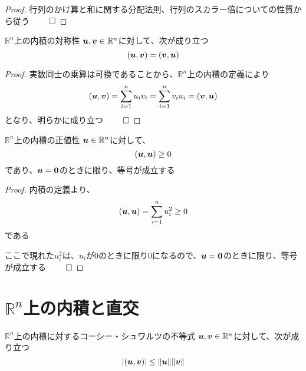 \documentclass[../../../topic_linear-algebra]{subfiles}
\begin{document}
\begin{proof}
  行列のかけ算と和に関する分配法則、行列のスカラー倍についての性質から従う $\qed$
\end{proof}

\br

\begin{theorem}{$\mathbb{R}^n$上の内積の対称性}
  $\vb*{u}, \vb*{v} \in \mathbb{R}^n$に対して、次が成り立つ
  \begin{equation*}
    (\vb*{u}, \vb*{v}) = (\vb*{v}, \vb*{u})
  \end{equation*}
\end{theorem}

\begin{proof}
  実数同士の乗算は可換であることから、$\mathbb{R}^n$上の内積の定義により
  \begin{equation*}
    (\vb*{u}, \vb*{v}) = \sum_{i=1}^n u_i v_i = \sum_{i=1}^n v_i u_i = (\vb*{v}, \vb*{u})
  \end{equation*}
  となり、明らかに成り立つ $\qed$
\end{proof}

\br

\begin{theorem}{$\mathbb{R}^n$上の内積の正値性}
  $\vb*{u} \in \mathbb{R}^n$に対して、
  \begin{equation*}
    (\vb*{u}, \vb*{u}) \geq 0
  \end{equation*}
  であり、$\vb*{u} = \vb*{0}$のときに限り、等号が成立する
\end{theorem}

\begin{proof}
  内積の定義より、
  \begin{equation*}
    (\vb*{u}, \vb*{u}) = \sum_{i=1}^n u_i^2 \geq 0
  \end{equation*}
  である

  ここで現れた$u_i^2$は、$u_i$が0のときに限り0になるので、$\vb*{u} = \vb*{0}$のときに限り、等号が成立する $\qed$
\end{proof}

\sectionline
\section{$\mathbb{R}^n$上の内積と直交}

\begin{theorem}{$\mathbb{R}^n$上の内積に対するコーシー・シュワルツの不等式}
  $\vb*{u}, \vb*{v} \in \mathbb{R}^n$に対して、次が成り立つ
  \begin{equation*}
    |(\vb*{u}, \vb*{v})| \leq \|\vb*{u}\| \|\vb*{v}\|
  \end{equation*}
\end{theorem}
\end{document}
